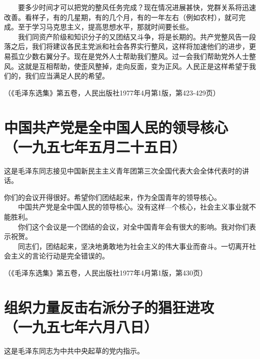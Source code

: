 \documentclass[cn,11pt,chinese]{elegantbook}
\def\myformat#1{\hfil\hfil #1}
\begin{document}
　　要多少时间才可以把党的整风任务完成？现在情况进展甚快，党群关系将迅速改善。看样子，有的几星期，有的几个月，有的一年左右（例如农村），就可完成。至于学习马克思主义，提高思想水平，那就时间要长些。\\
　　我们同资产阶级和知识分子的又团结又斗争，将是长期的。共产党整风告一段落之后，我们将建议各民主党派和社会各界实行整风，这样将加速他们的进步，更易孤立少数右翼分子。现在是党外人士帮助我们整风。过一会我们帮助党外人士整风。这就是互相帮助，使歪风整掉，走向反面，变为正风。人民正是这样希望于我们的，我们应当满足人民的希望。\\
\begin{flushright}（《毛泽东选集》第五卷，人民出版社1977年4月第1版，第423-429页）\end{flushright}
\newpage\section*{\myformat{中国共产党是全中国人民的领导核心}\\\myformat{（一九五七年五月二十五日）}}
\begin{introduction}\item  这是毛泽东同志接见中国新民主主义青年团第三次全国代表大会全体代表时的讲话。\end{introduction}
你们的会议开得很好。希望你们团结起来，作为全国青年的领导核心。\\
　　中国共产党是全中国人民的领导核心。没有这样—个核心，社会主义事业就不能胜利。\\
　　你们这个会议是一个团结的会议，对全中国青年会有很大的影响。我对你们表示祝贺。\\
　　同志们，团结起来，坚决地勇敢地为社会主义的伟大事业而奋斗。一切离开社会主义的言论行动是完全错误的。\\
\begin{flushright}（《毛泽东选集》第五卷，人民出版社1977年4月第1版，第430页）\end{flushright}
\newpage\section*{\myformat{组织力量反击右派分子的猖狂进攻}\\\myformat{（一九五七年六月八日）}}
\begin{introduction}\item 这是毛泽东同志为中共中央起草的党内指示。\end{introduction}
\end{document}
